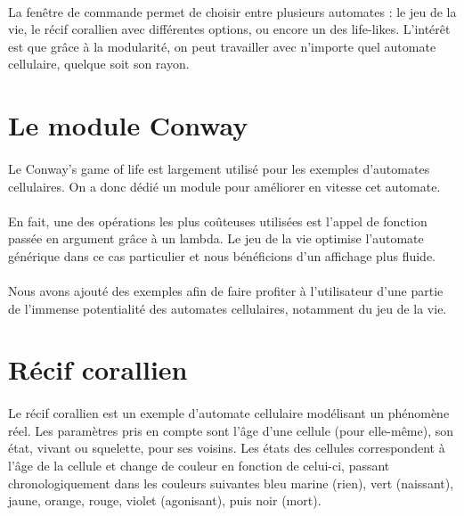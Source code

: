 \documentclass[a4paper]{article}
\begin{document}
\paragraph{} La fenêtre de commande permet de choisir entre plusieurs automates : le jeu de la vie, le récif corallien avec différentes options, ou encore un des life-likes. L'intérêt est que grâce à la modularité, on peut travailler avec n'importe quel automate cellulaire, quelque soit son rayon.

\section{Le module Conway}

\paragraph{} Le Conway's game of life est largement utilisé pour les exemples d'automates cellulaires. On a donc dédié un module pour améliorer en vitesse cet automate.

\paragraph{} En fait, une des opérations les plus coûteuses utilisées est l'appel de fonction passée en argument grâce à un lambda. Le jeu de la vie optimise l'automate générique dans ce cas particulier et nous bénéficions d'un affichage plus fluide.

\paragraph{} Nous avons ajouté des exemples afin de faire profiter à l'utilisateur d'une partie de l'immense potentialité des automates cellulaires, notamment du jeu de la vie.

\section{Récif corallien}

\paragraph{} Le récif corallien est un exemple d'automate cellulaire modélisant un phénomène réel. Les paramètres pris en compte sont l'âge d'une cellule (pour elle-même), son état, vivant ou squelette, pour ses voisins. Les états des cellules correspondent à l'âge de la cellule et change de couleur en fonction de celui-ci, passant chronologiquement dans les couleurs suivantes bleu marine (rien), vert (naissant), jaune, orange, rouge, violet (agonisant), puis noir (mort).
\end{document}
